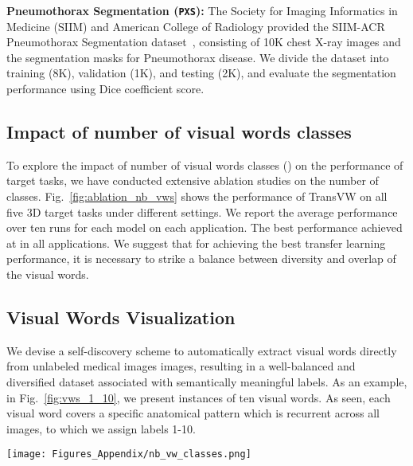\documentclass[journal,twoside,web]{ieeecolor}
\def\figurename{Fig.}
\begin{document}
\smallskip
\noindent\textbf{Pneumothorax Segmentation (\texttt{PXS}):}
The Society for Imaging Informatics in Medicine (SIIM) and American College of Radiology provided the SIIM-ACR Pneumothorax Segmentation dataset~\cite{PNEchallenge}, consisting of 10K chest X-ray images and the segmentation masks for Pneumothorax disease. We divide the dataset into training (8K), validation (1K), and testing (2K), and evaluate the segmentation performance using Dice coefficient score. 

 
\subsection{Impact of number of visual words classes}
\label{appendix_abl_num_vws}

To explore the impact of number of visual words classes () on the performance of target tasks, we have
conducted extensive ablation studies on the number of classes. \figurename~\ref{fig:ablation_nb_vws} shows the performance of TransVW on  all five 3D target tasks under different settings. We report the average performance over ten runs for each model on each application. The best performance achieved at  in all applications.  
We suggest that for achieving the best transfer learning performance, it is necessary to strike a balance between diversity and overlap of the visual words.


\subsection{Visual Words Visualization}
\label{appendix_vws}
We devise a self-discovery scheme to automatically extract visual words directly from unlabeled medical images images, resulting in a well-balanced and diversified dataset associated with semantically meaningful labels. As an example, in \figurename~\ref{fig:vws_1_10}, we present instances of ten visual words.  As seen, each visual word covers a specific anatomical pattern which is recurrent across all images, to which we assign labels 1-10.


\begin{figure*}[t]
\centerline{\texttt{[image: Figures\_Appendix/nb\_vw\_classes.png]}}
\caption{We conduct ablation study on the impact of number of visual words classes on the target task performance on five 3D target tasks. We report the average performance over ten runs for each model on each task. The best performance  achieved with  in all applications.   }
\label{fig:ablation_nb_vws}
\end{figure*}
\end{document}
